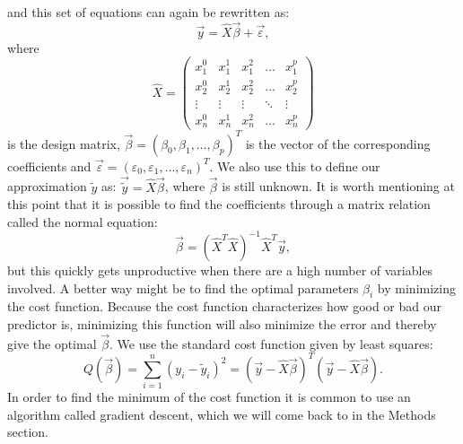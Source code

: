 \documentclass[a4paper,12pt]{article}
\begin{document}
and this set of equations can again be rewritten as:
\begin{equation}
\vec{y}=\hat{X}\vec{\beta}+\vec{\varepsilon},
\label{eq:y_xb}
\end{equation}
where
\begin{equation}
\hat{X}=\begin{pmatrix}
x_1^0&x_1^1&x_1^2&\hdots&x_1^p\\
x_2^0&x_2^1&x_2^2&\hdots&x_2^p\\
\vdots&\vdots&\vdots&\ddots&\vdots\\
x_n^0&x_n^1&x_n^2&\hdots&x_n^p
\end{pmatrix}
\end{equation}
is the design matrix, $\vec{\beta}=(\beta_0, \beta_1, \hdots, \beta_p)^T$ is the vector of the corresponding coefficients and $\vec{\varepsilon} = (\varepsilon_0, \varepsilon_1,..., \varepsilon_n)^T$.\newline
We also use this to define our approximation $\tilde{y}$ as: $\vec{\tilde{y}} = \hat{X}\vec{\beta}$, where $\vec{\beta}$ is still unknown.\newline
It is worth mentioning at this point that it is possible to find the coefficients through a matrix relation called the normal equation:
\begin{equation}
\vec{\beta}=(\hat{X}^T\hat{X})^{-1}\hat{X}^T\vec{y},
\end{equation}
but this quickly gets unproductive when there are a high number of variables involved. A better way might be to find the optimal parameters $\beta_i$ by minimizing the cost function. Because the cost function characterizes how good or bad our predictor is, minimizing this function will also minimize the error and thereby give the optimal $\vec{\beta}$.
We use the standard cost function given by least squares:
\begin{equation}
Q(\vec{\beta})=\sum_{i=1}^{n}(y_i-\tilde{y}_i)^2=(\vec{y}-\hat{X}\vec{\beta})^T(\vec{y}-\hat{X}\vec{\beta}).
\end{equation}
In order to find the minimum of the cost function it is common to use an algorithm called gradient descent, which we will come back to in the Methods section.
\end{document}
